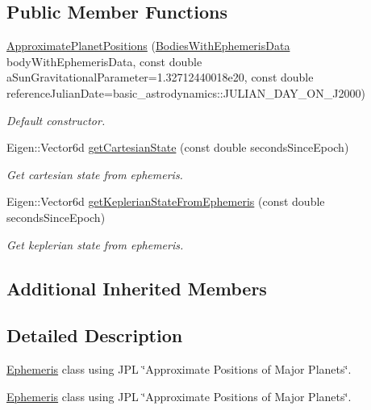 \subsection*{Public Member Functions}
\begin{DoxyCompactItemize}
\item 
\hyperlink{classtudat_1_1ephemerides_1_1ApproximatePlanetPositions_a5363e07d3ab914f1592e412035900899}{Approximate\+Planet\+Positions} (\hyperlink{classtudat_1_1ephemerides_1_1ApproximatePlanetPositionsBase_aa698885dcabac2815a6205d5502724d2}{Bodies\+With\+Ephemeris\+Data} body\+With\+Ephemeris\+Data, const double a\+Sun\+Gravitational\+Parameter=1.\+32712440018e20, const double reference\+Julian\+Date=basic\+\_\+astrodynamics\+::\+J\+U\+L\+I\+A\+N\+\_\+\+D\+A\+Y\+\_\+\+O\+N\+\_\+\+J2000)
\begin{DoxyCompactList}\small\item\em Default constructor. \end{DoxyCompactList}\item 
Eigen\+::\+Vector6d \hyperlink{classtudat_1_1ephemerides_1_1ApproximatePlanetPositions_a76a58a0bc977fb72020cda1837be1ddf}{get\+Cartesian\+State} (const double seconds\+Since\+Epoch)
\begin{DoxyCompactList}\small\item\em Get cartesian state from ephemeris. \end{DoxyCompactList}\item 
Eigen\+::\+Vector6d \hyperlink{classtudat_1_1ephemerides_1_1ApproximatePlanetPositions_a28a9f6436a540037f9da7a2d59d2342b}{get\+Keplerian\+State\+From\+Ephemeris} (const double seconds\+Since\+Epoch)
\begin{DoxyCompactList}\small\item\em Get keplerian state from ephemeris. \end{DoxyCompactList}\end{DoxyCompactItemize}
\subsection*{Additional Inherited Members}


\subsection{Detailed Description}
\hyperlink{classtudat_1_1ephemerides_1_1Ephemeris}{Ephemeris} class using J\+PL \char`\"{}\+Approximate Positions of Major Planets\char`\"{}. 

\hyperlink{classtudat_1_1ephemerides_1_1Ephemeris}{Ephemeris} class using J\+PL \char`\"{}\+Approximate Positions of Major Planets\char`\"{}. 

